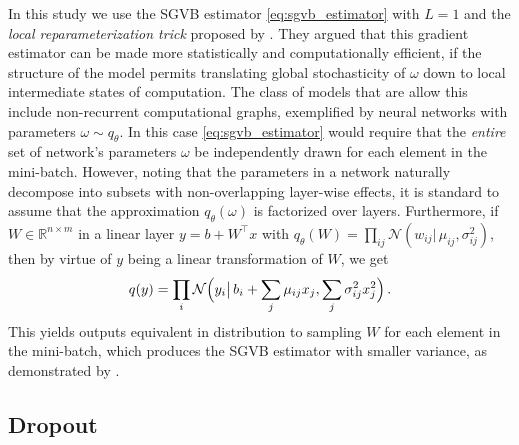\documentclass[a4paper,10pt,twocolumn]{article}
\begin{document}
In this study we use the SGVB estimator \eqref{eq:sgvb_estimator} with $L=1$ and the
\emph{local reparameterization trick} proposed by \citet{kingma_variational_2015}. They
argued that this gradient estimator can be made more statistically and computationally
efficient, if the structure of the model permits translating global stochasticity of
$\omega$ down to local intermediate states of computation.
%
The class of models that are allow this include non-recurrent computational graphs,
exemplified by neural networks with parameters $\omega \sim q_\theta$. In this case
\eqref{eq:sgvb_estimator} would require that the \emph{entire} set of network's parameters
$\omega$ be independently drawn for each element in the mini-batch. However, noting
that the parameters in a network naturally decompose into subsets with non-overlapping
layer-wise effects, it is standard to assume that the approximation $
  q_\theta(\omega)
$ is factorized over layers. Furthermore, if $
  W \in \mathbb{R}^{n\times m}
$ in a linear layer $
  y = b + W^\top x
$ with $
  q_\theta(W)
    = \prod_{ij}
      \mathcal{N}(w_{ij} \vert\, \mu_{ij}, \sigma_{ij}^2)
$, then by virtue of $y$ being a linear transformation of $W$, we get
\begin{equation}  \label{eq:r-gauss-trick}
  q(y) = \prod_i \mathcal{N}\Bigl(
        y_i \big\vert\,
        b_i + \sum_j \mu_{ij} x_j,
        \sum_j \sigma^2_{ij} x_j^2
    \Bigr)
  \,.
\end{equation}
This yields outputs equivalent in distribution to sampling $W$ for each element in
the mini-batch, which produces the SGVB estimator with smaller variance, as demonstrated
by \citet{kingma_variational_2015}.


\subsection{Dropout} %
\label{sub:dropout}
\end{document}
